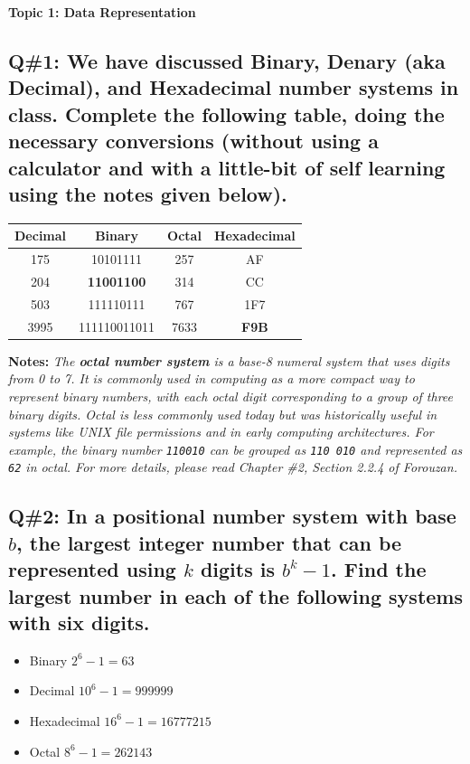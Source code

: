 \textbf{Topic 1: Data Representation}\\
\subsection{Q\#1: We have discussed Binary, Denary (aka Decimal), and Hexadecimal number systems in class. Complete the following table, doing the necessary conversions (without using a calculator and with a little-bit of self learning using the notes given below).}
\begin{center}
\begin{tabular}{|c|c|c|c|}
\hline
\textbf{Decimal} & \textbf{Binary} & \textbf{Octal} & \textbf{Hexadecimal} \\
\hline
175 & 10101111 & 257 & AF \\
\hline
204 & \textbf{11001100} & 314 & CC \\
\hline
503 & 111110111 & 767 & 1F7 \\
\hline
3995 & 111110011011 & 7633 & \textbf{F9B} \\
\hline
\end{tabular}
\end{center}

\vspace{1em}

\textbf{Notes:} \textit{The \textbf{octal number system} is a base-8 numeral system that uses digits from 0 to 7. It is commonly used in computing as a more compact way to represent binary numbers, with each octal digit corresponding to a group of three binary digits. Octal is less commonly used today but was historically useful in systems like UNIX file permissions and in early computing architectures. For example, the binary number \texttt{110010} can be grouped as \texttt{110 010} and represented as \texttt{62} in octal. For more details, please read \textit{Chapter \#2, Section 2.2.4} of \textit{Forouzan}.}

\vspace{1.5em}

\subsection{Q\#2: In a positional number system with base $b$, the largest integer number that can be represented using $k$ digits is $b^k - 1$. Find the largest number in each of the following systems with \textbf{six} digits.}
\begin{itemize}
    \item[(a)] Binary \quad $2^6 - 1 = 63$
    \item[(b)] Decimal \quad $10^6 - 1 = 999999$
    \item[(c)] Hexadecimal \quad $16^6 - 1 = 16777215$
    \item[(d)] Octal \quad $8^6 - 1 = 262143$
\end{itemize}
